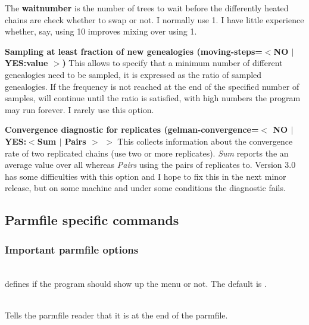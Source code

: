 \begin{description}
The \textbf{ waitnumber} is the number of trees to wait before the differently heated chains are check whether to swap or not. I normally use 1. I have little experience whether, say, using 10 improves mixing over using 1.

\item{\textbf{Sampling at least fraction of new genealogies (moving-steps=$<$NO $|$ YES:value $>$)}}
This allows to specify that a minimum number of different genealogies need to be sampled, it is expressed as the ratio of sampled genealogies. If the frequency is not reached at the end of the specified number of samples, \migrate will continue until the ratio is satisfied, with high numbers the program may run forever. I rarely use this option.
 
\item{ \textbf{Convergence diagnostic for replicates (gelman-convergence=$<$ NO $|$ YES:$<$Sum $|$ Pairs $>$ $>$}}
This collects information about the convergence rate of two replicated chains (use two or more replicates). \textsl{Sum} reports the an average value over all whereas \textsl{Pairs} using the pairs of replicates to. Version 3.0 has some difficulties with this option and I hope to fix this in the next minor release, but on some machine and under some conditions the diagnostic fails.
 
\end{description}
\subsection{Parmfile specific commands}
\subsubsection{Important parmfile options}
\begin{description}
\item{}\\
defines if the program should show up the menu or not.
The default is {}.

\item{}\\
Tells the parmfile reader that it is at the end of the parmfile.
\end{description}

